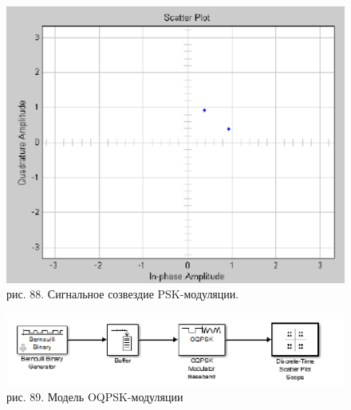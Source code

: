 \documentclass[10pt,a4paper]{report}
\begin{document}
\begin{figure}
\begin{center}
\includegraphics[width=150mm, scale = 0.9]{9_24}\newline
рис. 88. Сигнальное созвездие PSK-модуляции.\newline
\end{center}
\end{figure}
\begin{figure}
\begin{center}
\includegraphics[width=150mm, scale = 0.9]{9_25}\newline
рис. 89. Модель OQPSK-модуляции\newline
\end{center}
\end{figure}
\end{document}
